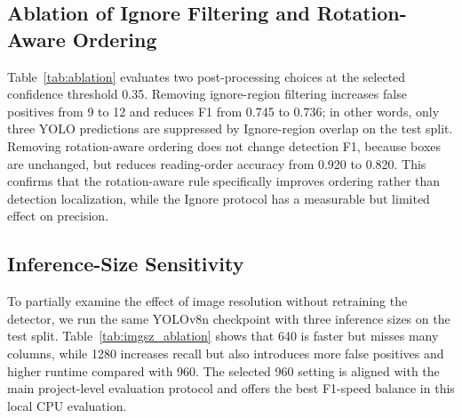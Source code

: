 \documentclass[12pt]{article}
\begin{document}
\subsection{Ablation of Ignore Filtering and Rotation-Aware Ordering}
Table~\ref{tab:ablation} evaluates two post-processing choices at the selected confidence threshold 0.35. Removing ignore-region filtering increases false positives from 9 to 12 and reduces F1 from 0.745 to 0.736; in other words, only three YOLO predictions are suppressed by Ignore-region overlap on the test split. Removing rotation-aware ordering does not change detection F1, because boxes are unchanged, but reduces reading-order accuracy from 0.920 to 0.820. This confirms that the rotation-aware rule specifically improves ordering rather than detection localization, while the Ignore protocol has a measurable but limited effect on precision.

\begin{table}[t]
\centering
\caption{Ablation of ignore-region filtering and rotation-aware reading order at score threshold 0.35. Removed denotes predictions suppressed because they overlap an Ignore region.}
\label{tab:ablation}
\end{table}


\subsection{Inference-Size Sensitivity}
To partially examine the effect of image resolution without retraining the detector, we run the same YOLOv8n checkpoint with three inference sizes on the test split. Table~\ref{tab:imgsz_ablation} shows that 640 is faster but misses many columns, while 1280 increases recall but also introduces more false positives and higher runtime compared with 960. The selected 960 setting is aligned with the main project-level evaluation protocol and offers the best F1-speed balance in this local CPU evaluation.
\end{document}
